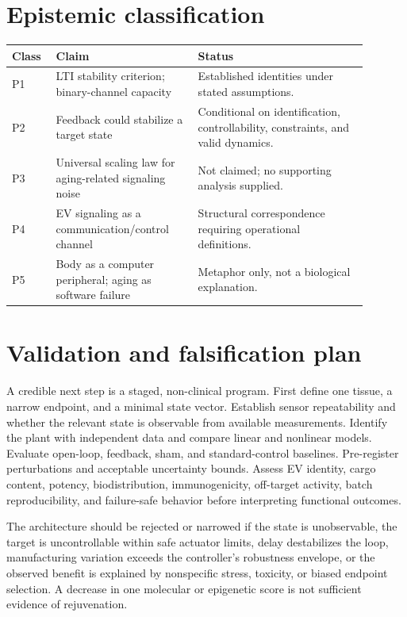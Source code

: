\documentclass[11pt]{article}
\begin{document}
\section{Epistemic classification}
\begin{center}\small
\begin{tabular}{p{0.10\linewidth}p{0.36\linewidth}p{0.43\linewidth}}\toprule
Class & Claim & Status \\ \midrule
P1 & LTI stability criterion; binary-channel capacity & Established identities under stated assumptions. \\
P2 & Feedback could stabilize a target state & Conditional on identification, controllability, constraints, and valid dynamics. \\
P3 & Universal scaling law for aging-related signaling noise & Not claimed; no supporting analysis supplied. \\
P4 & EV signaling as a communication/control channel & Structural correspondence requiring operational definitions. \\
P5 & Body as a computer peripheral; aging as software failure & Metaphor only, not a biological explanation. \\ \bottomrule
\end{tabular}\end{center}

\section{Validation and falsification plan}
A credible next step is a staged, non-clinical program. First define one tissue, a narrow endpoint, and a minimal state vector. Establish sensor repeatability and whether the relevant state is observable from available measurements. Identify the plant with independent data and compare linear and nonlinear models. Evaluate open-loop, feedback, sham, and standard-control baselines. Pre-register perturbations and acceptable uncertainty bounds. Assess EV identity, cargo content, potency, biodistribution, immunogenicity, off-target activity, batch reproducibility, and failure-safe behavior before interpreting functional outcomes.

The architecture should be rejected or narrowed if the state is unobservable, the target is uncontrollable within safe actuator limits, delay destabilizes the loop, manufacturing variation exceeds the controller's robustness envelope, or the observed benefit is explained by nonspecific stress, toxicity, or biased endpoint selection. A decrease in one molecular or epigenetic score is not sufficient evidence of rejuvenation.
\end{document}

